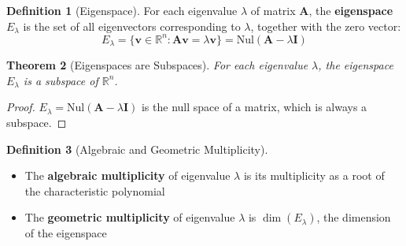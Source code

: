 \documentclass[12pt]{article}
\numberwithin{equation}{section}
\newcommand{\RR}{\mathbb{R}}
\newcommand{\vect}[1]{\boldsymbol{#1}}   %
\newcommand{\mat}[1]{\mathbf{#1}}        %
\theoremstyle{plain}
\newtheorem{theorem}{Theorem}[section]
\theoremstyle{definition}
\newtheorem{definition}[theorem]{Definition}
\theoremstyle{remark}
\begin{document}
\begin{definition}[Eigenspace]
For each eigenvalue $\lambda$ of matrix $\mat{A}$, the \textbf{eigenspace} $E_\lambda$ is the set of all eigenvectors corresponding to $\lambda$, together with the zero vector:
$$E_\lambda = \{\vect{v} \in \RR^n : \mat{A}\vect{v} = \lambda\vect{v}\} = \text{Nul}(\mat{A} - \lambda\mat{I})$$
\end{definition}

\begin{theorem}[Eigenspaces are Subspaces]
For each eigenvalue $\lambda$, the eigenspace $E_\lambda$ is a subspace of $\RR^n$.
\end{theorem}

\begin{proof}
$E_\lambda = \text{Nul}(\mat{A} - \lambda\mat{I})$ is the null space of a matrix, which is always a subspace.
\end{proof}

\begin{definition}[Algebraic and Geometric Multiplicity]
\begin{itemize}
\item The \textbf{algebraic multiplicity} of eigenvalue $\lambda$ is its multiplicity as a root of the characteristic polynomial
\item The \textbf{geometric multiplicity} of eigenvalue $\lambda$ is $\dim(E_\lambda)$, the dimension of the eigenspace
\end{itemize}
\end{definition}
\end{document}
